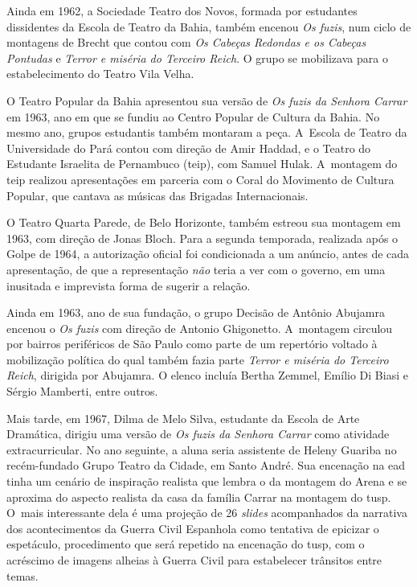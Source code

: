Ainda em 1962, a Sociedade Teatro dos Novos, formada por estudantes
dissidentes da Escola de Teatro da Bahia, também encenou {\it Os fuzis},
num ciclo de montagens de Brecht que contou com {\it Os Cabeças Redondas
e os Cabeças Pontudas} e {\it Terror e miséria do Terceiro Reich}. O
grupo se mobilizava para o estabelecimento do Teatro Vila Velha.

O Teatro Popular da Bahia apresentou sua versão de {\it Os fuzis da
Senhora Carrar} em 1963, ano em que se fundiu ao Centro Popular de
Cultura da Bahia. No mesmo ano, grupos estudantis também montaram a
peça. A~Escola de Teatro da Universidade do Pará contou com direção de
Amir Haddad, e o Teatro do Estudante Israelita de Pernambuco ({\sc teip}), com
Samuel Hulak. A~montagem do {\sc teip} realizou apresentações em parceria com
o Coral do Movimento de Cultura Popular, que cantava as músicas das
Brigadas Internacionais.

O Teatro Quarta Parede, de Belo Horizonte, também estreou sua montagem
em 1963, com direção de Jonas Bloch. Para a segunda temporada, realizada
após o Golpe de 1964, a autorização oficial foi condicionada a um
anúncio, antes de cada apresentação, de que a representação {\it não}
teria a ver com o governo, em uma inusitada e imprevista forma de
sugerir a relação.

Ainda em 1963, ano de sua fundação, o grupo Decisão de Antônio Abujamra
encenou o {\it Os fuzis} com direção de Antonio Ghigonetto. A~montagem
circulou por bairros periféricos de São Paulo como parte de um
repertório voltado à mobilização política do qual também fazia parte
{\it Terror e miséria do Terceiro Reich}, dirigida por Abujamra. O
elenco incluía Bertha Zemmel, Emílio Di Biasi e Sérgio Mamberti, entre
outros.

Mais tarde, em 1967, Dilma de Melo Silva, estudante da Escola de Arte
Dramática, dirigiu uma versão de {\it Os fuzis da Senhora Carrar} como
atividade extracurricular. No ano seguinte, a aluna seria assistente de
Heleny Guariba no recém-fundado Grupo Teatro da Cidade, em Santo André.
Sua encenação na {\sc ead} tinha um cenário de inspiração realista que lembra
o da montagem do Arena e se aproxima do aspecto realista da casa da
família Carrar na montagem do {\sc tusp}. O~mais interessante dela é uma
projeção de 26 {\it slides} acompanhados da narrativa dos acontecimentos
da Guerra Civil Espanhola como tentativa de epicizar o espetáculo,
procedimento que será repetido na encenação do {\sc tusp}, com o acréscimo de
imagens alheias à Guerra Civil para estabelecer trânsitos entre temas.

